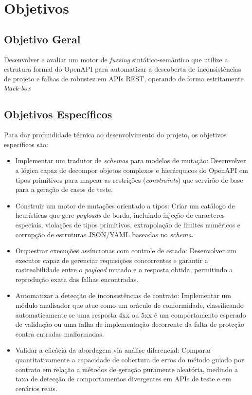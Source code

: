 \section{Objetivos}

\subsection{Objetivo Geral}
Desenvolver e avaliar um motor de \textit{fuzzing} sintático-semântico que utilize a estrutura formal do OpenAPI para automatizar a descoberta de inconsistências de projeto e falhas de robustez em APIs REST, operando de forma estritamente \textit{black-box}

\subsection{Objetivos Específicos}
Para dar profundidade técnica ao desenvolvimento do projeto, os objetivos específicos são:

\begin{itemize}
	\item Implementar um tradutor de \textit{schemas} para modelos de mutação: Desenvolver a lógica capaz de decompor objetos complexos e hierárquicos do OpenAPI em tipos primitivos para mapear as restrições (\textit{constraints}) que servirão de base para a geração de casos de teste.
	\item Construir um motor de mutações orientado a tipos: Criar um catálogo de heurísticas que gere \textit{payloads} de borda, incluindo injeção de caracteres especiais, violações de tipos primitivos, extrapolação de limites numéricos e corrupção de estruturas JSON/YAML baseadas no \textit{schema}.
	\item Orquestrar execuções assíncronas com controle de estado: Desenvolver um executor capaz de gerenciar requisições concorrentes e garantir a rastreabilidade entre o \textit{payload} mutado e a resposta obtida, permitindo a reprodução exata das falhas encontradas.
	\item Automatizar a detecção de inconsistências de contrato: Implementar um módulo analisador que atue como um oráculo de conformidade, classificando automaticamente se uma resposta 4xx ou 5xx é um comportamento esperado de validação ou uma falha de implementação decorrente da falta de proteção contra entradas malformadas.
	\item Validar a eficácia da abordagem via análise diferencial: Comparar quantitativamente a capacidade de cobertura de erros do método guiado por contrato em relação a métodos de geração puramente aleatória, medindo a taxa de detecção de comportamentos divergentes em APIs de teste e em cenários reais.
\end{itemize}
